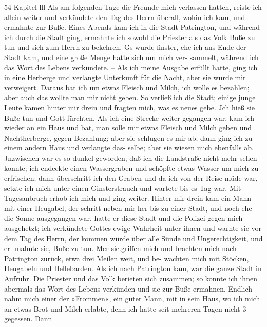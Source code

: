 54 Kapitel lll
Als am folgenden Tage die Freunde mich verlassen hatten,
reiste ich allein weiter und verkündete den Tag des Herrn überall,
wohin ich kam, und ermahnte zur Buße. Eines Abends kam ich
in die Stadt Patrington, und während ich durch die Stadt ging,
ermahnte ich sowohl die Priester als das Volk Buße zu tun und
sich zum Herrn zu bekehren. Gs wurde finster, ehe ich ans Ende
der Stadt kam, und eine große Menge hatte sich um mich ver-
sammelt, während ich das Wort des Lebens verkündete. -- Als
ich meine Ausgabe erfüllt hatte, ging ich in eine Herberge und
verlangte Unterkunft für die Nacht, aber sie wurde mir verweigert.
Daraus bat ich um etwas Fleisch und Milch, ich wolle es bezahlen;
aber auch das wollte man mir nicht geben. So verließ ich die
Stadt; einige junge Leute kamen hinter mir drein und fragten
mich, was es neues gebe. Jch hieß sie Buße tun und Gott
fürchten. Als ich eine Strecke weiter gegangen war, kam ich wieder
an ein Haus und bat, man solle mir etwas Fleisch und Milch
geben und Nachtherberge, gegen Bezahlung; aber sie schlugen es
mir ab; dann ging ich zu einem andern Haus und verlangte das-
selbe; aber sie wiesen mich ebenfalls ab. Jnzwischen war es so
dunkel geworden, daß ich die Landstraße nicht mehr sehen konnte;
ich endeckte einen Wassergraben und schöpfte etwas Wasser um
mich zu erfrischen; dann überschritt ich den Graben und da ich
von der Reise müde war, setzte ich mich unter einen Ginsterstrauch
und wartete bis es Tag war. Mit Tagesanbruch erhob ich mich
und ging weiter. Hinter mir drein kam ein Mann mit einer
Heugabel, der schritt neben mir her bis zu einer Stadt, und
noch ehe die Sonne ausgegangen war, hatte er diese Stadt und
die Polizei gegen mich ausgehetzt; ich verkündete Gottes ewige
Wahrheit unter ihnen und warnte sie vor dem Tag des Herrn,
der kommen würde über alle Sünde und Ungerechtigkeit, und er-
mahnte sie, Buße zu tun. Mer sie.griffen mich und brachten
mich nach Patrington zurück, etwa drei Meilen weit, und be-
wachten mich mit Stöcken, Heugabeln und Hellebarden. Als ich
nach Patrington kam, war die ganze Stadt in Aufruhr. Die
Priester und das Volk berieten sich zusammen; so konnte ich
ihnen abermals das Wort des Lebens verkünden und sie zur Buße
ermahnen. Endlich nahm mich einer der »Frommen«, ein guter
Mann, mit in sein Haus, wo ich mich an etwas Brot und Milch
erlabte, denn ich hatte seit mehreren Tagen nicht-3 gegessen. Dann


